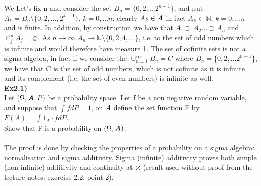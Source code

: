 \documentclass[12pt,mythesisstyle]{report}
\begin{document}
We Let's fix n and consider the set \(B_n=\{0,2,...2^{n-1}\}\), and put \(A_k=B_n\setminus\{0,2,...,2^{k-1}\}\), \(k=0,...n\): clearly \(A_k\in\textbf{\textit{A}}\) in fact \(A_k\subset\mathbb{N}\), \(k=0,...n\) and is finite. In addition, by construction we have that \(A_1\supset A_2...\supset A_n\) and $\cap_{j}^n A_j=\varnothing$. As \(n\rightarrow\infty\) $A_n\rightarrow\mathbb{N}\setminus\{0,2,4,...\}$, i.e. to the set of odd numbers which is infinite and would therefore have measure 1. The set of cofinite sets is not a sigma algebra, in fact if we consider the \(\cup_{n=1}^\infty B_n=C\) where $B_n=\{0,2,...2^{n-1}\}$, we have that C is the set of odd numbers, which is not cofinite as it is infinite and its complement (i.e. the set of even numbers) is infinite as well.
\\
\textbf{Ex2.1)}\\
Let $(\Omega, \textbf{\textit{A}}, P)$ be a probability space. Let f be a non negative random variable, and suppose that $\int fdP=1$, on \textbf{\textit{A}} define the set function F by $F(A)=\int1_A\cdot fdP$.
\\
Show that F is a probability on $(\Omega, \textbf{\textit{A}})$.
\\
\\The proof is done by checking the properties of a probability on a sigma algebra: normalisation and sigma additivity. Sigma (infinite) additivity proves both simple (non infinite) additivity and continuity at $\varnothing$ (result used without proof from the lecture notes: exercise 2.2, point 2).
\end{document}
